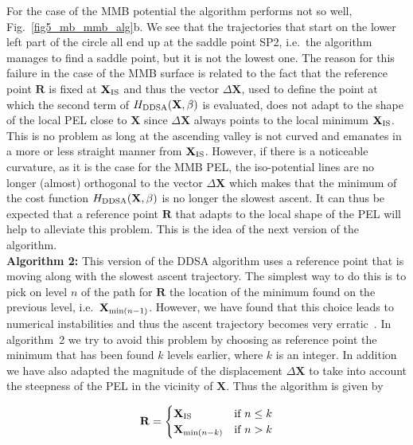 \documentclass[aip,pre,twocolumn,reprint]{revtex4-1}
\begin{document}
For the case of the MMB potential the algorithm performs not so well,
Fig.~\ref{fig5_mb_mmb_alg}b. We see that the trajectories that start
on the lower left part of the circle all end up at the saddle point
SP2, i.e.~the algorithm manages to find a saddle point, but it is not
the lowest one. The reason for this failure in the case of the MMB
surface is related to the fact that the reference point $\mathbf{R}$
is fixed at $\mathbf{X}_{\rm IS}$ and thus the vector $\Delta
\mathbf{X}$, used to define the point at which the second term of
$H_{\rm DDSA}(\mathbf{X},\beta)$ is evaluated, does not adapt to the
shape of the local PEL close to $\mathbf{X}$ since $\Delta \mathbf{X}$
always points to the local minimum $\mathbf{X}_{\rm IS}$. This is no
problem as long at the ascending valley is not curved and emanates in
a more or less straight manner from $\mathbf{X}_{\rm IS}$. However,
if there is a noticeable curvature, as it is the case for the MMB PEL,
the iso-potential lines are no longer (almost) orthogonal to the vector
$\Delta \mathbf{X}$ which makes that the minimum of the cost function
$H_{\rm DDSA}(\mathbf{X},\beta)$ is no longer the slowest ascent. It can
thus be expected that a reference point $\mathbf{R}$ that adapts to the
local shape of the PEL will help to alleviate this problem. This is the
idea of the next version of the algorithm.\\

{\bf Algorithm 2:} This version of the DDSA algorithm uses a reference
point that is moving along with the slowest ascent trajectory. The
simplest way to do this is to pick on level $n$ of the path for
$\mathbf{R}$ the location of the minimum found on the previous level,
i.e.~$\mathbf{X}_{{\rm min}(n-1)}$. However, we have found that this choice
leads to numerical instabilities and thus the ascent trajectory becomes
very erratic~\cite{bonfanti_phd_16}. In algorithm~2 we try to avoid
this problem by choosing as reference point the minimum that has been
found $k$ levels earlier, where $k$ is an integer. In addition we have
also adapted the magnitude of the displacement $\Delta \mathbf{X}$
to take into account the steepness of the PEL in the vicinity of
$\mathbf{X}$. Thus the algorithm is given by

\begin{equation}
   \mathbf{R}= 
\begin{cases}
    \mathbf{X}_{\rm IS} & \text{if}~n\leq k \\
    \mathbf{X}_{{\rm min}(n-k)} & \text{if}~n>k
\end{cases}
\label{eq_14}
\end{equation} 
\end{document}
